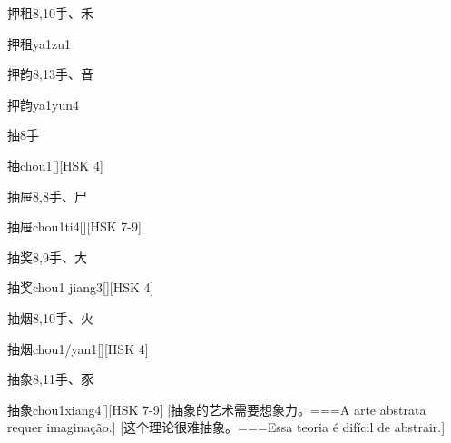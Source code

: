 \begin{Entry}{押租}{8,10}{⼿、⽲}
  \begin{Phonetics}{押租}{ya1zu1}
  \end{Phonetics}
\end{Entry}

\begin{Entry}{押韵}{8,13}{⼿、⾳}
  \begin{Phonetics}{押韵}{ya1yun4}
  \end{Phonetics}
\end{Entry}

\begin{Entry}{抽}{8}{⼿}
  \begin{Phonetics}{抽}{chou1}[][HSK 4]
  \end{Phonetics}
\end{Entry}

\begin{Entry}{抽屉}{8,8}{⼿、⼫}
  \begin{Phonetics}{抽屉}{chou1ti4}[][HSK 7-9]
  \end{Phonetics}
\end{Entry}

\begin{Entry}{抽奖}{8,9}{⼿、⼤}
  \begin{Phonetics}{抽奖}{chou1 jiang3}[][HSK 4]
  \end{Phonetics}
\end{Entry}

\begin{Entry}{抽烟}{8,10}{⼿、⽕}
  \begin{Phonetics}{抽烟}{chou1/yan1}[][HSK 4]
  \end{Phonetics}
\end{Entry}

\begin{Entry}{抽象}{8,11}{⼿、⾗}
  \begin{Phonetics}{抽象}{chou1xiang4}[][HSK 7-9]
    [抽象的艺术需要想象力。===A arte abstrata requer imaginação.]
    [这个理论很难抽象。===Essa teoria é difícil de abstrair.]
  \end{Phonetics}
\end{Entry}

